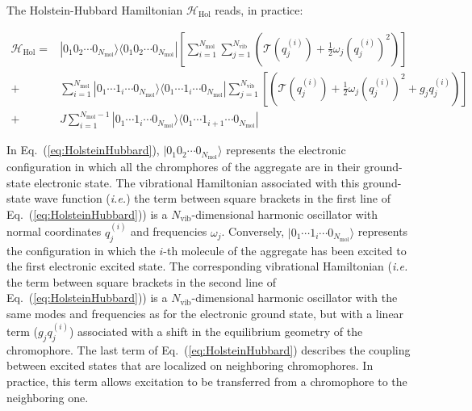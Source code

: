 \documentclass[bibliography=totoc,12pt,a4paper]{scrartcl}
\begin{document}
The Holstein-Hubbard Hamiltonian $\mathcal{H}_\text{Hol}$ reads, in practice:

\begin{equation}
 \begin{aligned}
  \mathcal{H}_\text{Hol} =& | 0_1 0_2 \cdots 0_{N_\text{mol}} \rangle \langle 0_1 0_2 \cdots 0_{N_\text{mol}} |
	\left[ \sum_{i=1}^{N_\text{mol}} \sum_{j=1}^{N_\text{vib}} 
		   \left( \mathcal{T}(q_{j}^{(i)}) + \frac{1}{2} \omega_j \left( q_j^{(i)} \right)^2 \right)
	\right] \\
	+& \sum_{i=1}^{N_\text{mol}} | 0_1 \cdots 1_i \cdots 0_{N_\text{mol}} \rangle 
								 \langle 0_1 \cdots 1_i \cdots 0_{N_\text{mol}} | 
	   \sum_{j=1}^{N_\text{vib}} \left[ 
	   \left( \mathcal{T}(q_{j}^{(i)}) 
			+ \frac{1}{2} \omega_j \left( q_j^{(i)} \right)^2 + g_j q_{j}^{(i)} \right) 
	   \right] \\
    +& J \sum_{i=1}^{N_\text{mol}-1} | 0_1 \cdots 1_i \cdots 0_{N_\text{mol}} \rangle
	   								 \langle 0_1 \cdots 1_{i+1} \cdots 0_{N_\text{mol}} |
 \end{aligned}
 \label{eq:HolsteinHubbard}
\end{equation}

In Eq.~(\ref{eq:HolsteinHubbard}), $| 0_1 0_2 \cdots 0_{N_\text{mol}} \rangle$ represents the electronic configuration in which all the chromphores of the aggregate are in their ground-state electronic state.
The vibrational Hamiltonian associated with this ground-state wave function (\textit{i.e.}) the term between square brackets in the first line of Eq.~(\ref{eq:HolsteinHubbard})) is a $N_\text{vib}$-dimensional harmonic oscillator with normal coordinates $q_{j}^{(i)}$ and frequencies $\omega_j$.
Conversely, $| 0_1 \cdots 1_i \cdots 0_{N_\text{mol}} \rangle$ represents the configuration in which the $i$-th molecule of the aggregate has been excited to the first electronic excited state.
The corresponding vibrational Hamiltonian (\textit{i.e.} the term between square brackets in the second line of Eq.~(\ref{eq:HolsteinHubbard})) is a $N_\text{vib}$-dimensional harmonic oscillator with the same modes and frequencies as for the electronic ground state, but with a linear term ($g_j q_{j}^{(i)}$) associated with a shift in the equilibrium geometry of the chromophore.
The last term of Eq.~(\ref{eq:HolsteinHubbard}) describes the coupling between excited states that are localized on neighboring chromophores.
In practice, this term allows excitation to be transferred from a chromophore to the neighboring one.
\end{document}
